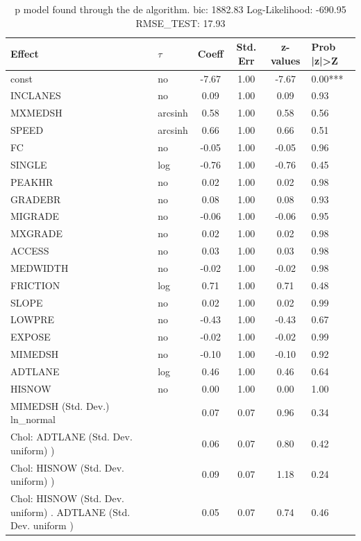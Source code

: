 \begin{table}
	\caption{p model found through the de algorithm. bic: 1882.83 Log-Likelihood: -690.95 RMSE_TEST: 17.93}
	\begin{center}
		\begin{tabular}{|l|l|c|c|c|l|}
			\hline
			Effect & $\tau$ & Coeff & Std. Err & z-values & Prob |z|>Z \\
			\hline
			const & no & -7.67 & 1.00 & -7.67 & 0.00*** \\
			\hline
			INCLANES & no & 0.09 & 1.00 & 0.09 & 0.93 \\
			\hline
			MXMEDSH & arcsinh & 0.58 & 1.00 & 0.58 & 0.56 \\
			\hline
			SPEED & arcsinh & 0.66 & 1.00 & 0.66 & 0.51 \\
			\hline
			FC & no & -0.05 & 1.00 & -0.05 & 0.96 \\
			\hline
			SINGLE & log & -0.76 & 1.00 & -0.76 & 0.45 \\
			\hline
			PEAKHR & no & 0.02 & 1.00 & 0.02 & 0.98 \\
			\hline
			GRADEBR & no & 0.08 & 1.00 & 0.08 & 0.93 \\
			\hline
			MIGRADE & no & -0.06 & 1.00 & -0.06 & 0.95 \\
			\hline
			MXGRADE & no & 0.02 & 1.00 & 0.02 & 0.98 \\
			\hline
			ACCESS & no & 0.03 & 1.00 & 0.03 & 0.98 \\
			\hline
			MEDWIDTH & no & -0.02 & 1.00 & -0.02 & 0.98 \\
			\hline
			FRICTION & log & 0.71 & 1.00 & 0.71 & 0.48 \\
			\hline
			SLOPE & no & 0.02 & 1.00 & 0.02 & 0.99 \\
			\hline
			LOWPRE & no & -0.43 & 1.00 & -0.43 & 0.67 \\
			\hline
			EXPOSE & no & -0.02 & 1.00 & -0.02 & 0.99 \\
			\hline
			MIMEDSH & no & -0.10 & 1.00 & -0.10 & 0.92 \\
			\hline
			ADTLANE & log & 0.46 & 1.00 & 0.46 & 0.64 \\
			\hline
			HISNOW & no & 0.00 & 1.00 & 0.00 & 1.00 \\
			\hline
			MIMEDSH (Std. Dev.) ln_normal &  & 0.07 & 0.07 & 0.96 & 0.34 \\
			\hline
			 Chol: ADTLANE (Std. Dev. uniform) ) &  & 0.06 & 0.07 & 0.80 & 0.42 \\
			\hline
			 Chol: HISNOW (Std. Dev. uniform) ) &  & 0.09 & 0.07 & 1.18 & 0.24 \\
			\hline
			 Chol: HISNOW (Std. Dev. uniform) . ADTLANE (Std. Dev.   uniform ) &  & 0.05 & 0.07 & 0.74 & 0.46 \\
			\hline
		\end{tabular}
	\end{center}
\end{table}